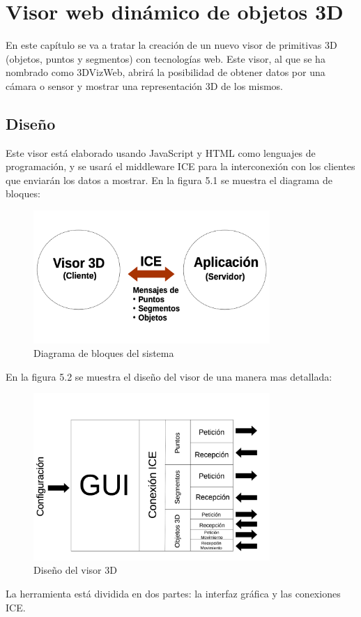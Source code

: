 \chapter{Visor web dinámico de objetos 3D}\label{cap.visor3d}
En este capítulo se va a tratar la creación de un nuevo visor de primitivas 3D (objetos, puntos y segmentos) con tecnologías web. Este visor, al que se ha nombrado como 3DVizWeb,  abrirá la posibilidad de obtener datos por una cámara o sensor y mostrar una representación 3D de los mismos.
\section{Diseño}
Este visor está elaborado usando JavaScript y HTML como lenguajes de programación, y se usará el middleware ICE para la interconexión con los clientes que enviarán los datos a mostrar. En la figura 5.1 se muestra el diagrama de bloques:

\begin{figure}[H]
  \begin{center}
    \includegraphics[width=0.8\textwidth]{figures/esquemavisor.png}
		\caption{Diagrama de bloques del sistema}
		\label{fig.diseno3dviz}
		\end{center}
\end{figure}

En la figura 5.2 se muestra el diseño del visor de una manera mas detallada:

\begin{figure}[H]
  \begin{center}
    \includegraphics[width=0.8\textwidth]{figures/diseno3dviz.png}
		\caption{Diseño del visor 3D}
		\label{fig.diseno3dviz}
		\end{center}
\end{figure}
La herramienta está dividida en dos partes: la interfaz gráfica y las conexiones ICE.

